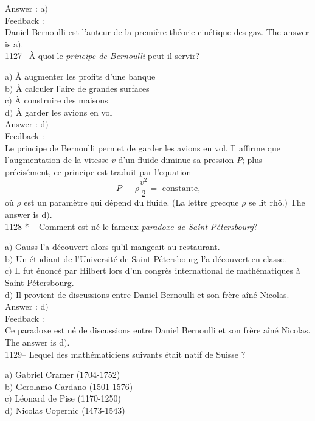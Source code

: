 \documentclass[letterpaper, 12pt]{article}
\begin{document}
Answer : a$)$\\

Feedback : \\
Daniel Bernoulli est l'auteur de la premi\`ere th\'eorie cin\'etique
des gaz.
The answer is a$)$.\\

1127-- \`A quoi le {\sl principe de Bernoulli} peut-il servir?

a$)$ \`A augmenter les profits d'une banque \\
b$)$ \`A calculer l'aire de grandes surfaces \\
c$)$ \`A construire des maisons \\
d$)$ \`A garder les avions en vol \\

Answer : d$)$\\

Feedback : \\
Le principe de Bernoulli permet de garder les avions en vol. Il
affirme que l'augmentation de la vitesse $v$ d'un fluide diminue sa
pression $P$; plus pr\'ecis\'ement, ce principe est traduit par
l'equation
$$\displaystyle{P\,+\,\rho\frac{v^2}2= \text{ constante,}}$$
o\`u $\rho$ est un param\`etre qui d\'epend du fluide. (La lettre
grecque $\rho$ se lit rh\^o.)
The answer is d$)$.\\

1128 * -- Comment est n\'e le fameux {\sl paradoxe de
Saint-P\'etersbourg}?

a$)$ Gauss l'a d\'ecouvert alors qu'il mangeait au restaurant. \\
b$)$ Un \'etudiant de l'Universit\'e de Saint-P\'etersbourg l'a d\'ecouvert
en classe. \\
c$)$ Il fut \'enonc\'e par Hilbert lors d'un congr\`es international de
math\'ematiques \`a Saint-P\'etersbourg.\\
d$)$ Il provient de discussions entre Daniel Bernoulli et son fr\`ere
a\^in\'e Nicolas.\\

Answer : d$)$\\

Feedback : \\
Ce paradoxe est n\'e de discussions entre Daniel Bernoulli et son
fr\`ere a\^in\'e Nicolas.
The answer is d$)$.\\

1129-- Lequel des math\'ematiciens suivants \'etait natif de Suisse
?

a$)$ Gabriel Cramer (1704-1752) \\
b$)$ Gerolamo Cardano (1501-1576) \\
c$)$ L\'eonard de Pise (1170-1250) \\
d$)$ Nicolas Copernic (1473-1543)\\
\end{document}
